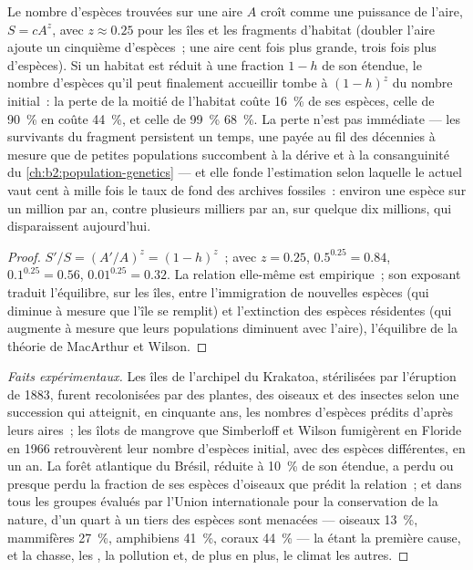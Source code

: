 \begin{theorem}\label{thm:b2:global-change:sar}
Le nombre d'espèces trouvées sur une aire $A$ croît comme une puissance de
l'aire, $S = cA^{z}$, avec $z \approx 0.25$ pour les îles et les
fragments d'habitat (doubler l'aire ajoute un cinquième d'espèces~; une
aire cent fois plus grande, trois fois plus d'espèces). Si un habitat est
réduit à une fraction $1 - h$ de son étendue, le nombre d'espèces qu'il
peut finalement accueillir tombe à $(1 - h)^{z}$ du nombre initial~: la
perte de la moitié de l'habitat coûte \qty{16}{\%} de ses espèces,
celle de \qty{90}{\%} en coûte \qty{44}{\%}, et celle de \qty{99}{\%}
\qty{68}{\%}. La perte n'est pas immédiate --- les survivants du
fragment persistent un temps, une \emph{} payée au fil
des décennies à mesure que de petites populations succombent à la dérive
et à la consanguinité du
\cref{ch:b2:population-genetics} --- et elle fonde l'estimation selon
laquelle le  actuel vaut cent à mille fois le taux de
fond des archives fossiles~: environ une espèce sur un million par an,
contre plusieurs milliers par an, sur quelque dix millions, qui
disparaissent aujourd'hui.
\end{theorem}
\begin{proof}
$S'/S = (A'/A)^{z} = (1 - h)^{z}$~; avec $z = 0.25$, $0.5^{0.25} =
0.84$, $0.1^{0.25} = 0.56$, $0.01^{0.25} = 0.32$. La relation
elle-même est empirique~; son exposant traduit l'équilibre, sur les îles,
entre l'immigration de nouvelles espèces (qui diminue à mesure que l'île
se remplit) et l'extinction des espèces résidentes (qui augmente à mesure
que leurs populations diminuent avec l'aire), l'équilibre de la théorie
de MacArthur et Wilson.
\end{proof}
\begin{proof}[Faits expérimentaux]
Les îles de l'archipel du Krakatoa, stérilisées par l'éruption de
1883, furent recolonisées par des plantes, des oiseaux et des insectes
selon une succession qui atteignit, en cinquante ans, les nombres
d'espèces prédits d'après leurs aires~; les îlots de mangrove que
Simberloff et Wilson fumigèrent en Floride en 1966 retrouvèrent leur
nombre d'espèces initial, avec des espèces différentes, en un an. La
forêt atlantique du Brésil, réduite à \qty{10}{\%} de son étendue, a
perdu ou presque perdu la fraction de ses espèces d'oiseaux que prédit la
relation~; et dans tous les groupes évalués par l'Union internationale
pour la conservation de la nature, d'un quart à un tiers des espèces sont
menacées --- oiseaux \qty{13}{\%}, mammifères \qty{27}{\%}, amphibiens
\qty{41}{\%}, coraux
\qty{44}{\%} --- la  étant la première cause, et la chasse,
les , la pollution et, de plus en plus, le climat les
autres.
\end{proof}

